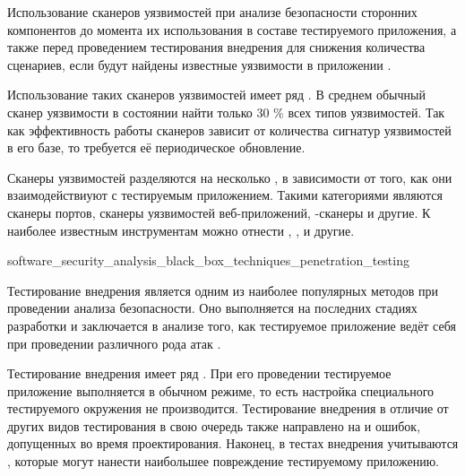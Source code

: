 %
Использование сканеров уязвимостей  при анализе безопасности сторонних компонентов до момента их использования в составе тестируемого приложения, а также перед проведением тестирования внедрения для снижения количества сценариев, если будут найдены известные уязвимости в приложении . 

%
Использование таких сканеров уязвимостей имеет ряд  . 
%
В среднем обычный сканер уязвимости в состоянии найти только 30 \% всех типов уязвимостей. 
%
Так как эффективность работы сканеров зависит от количества сигнатур уязвимостей в его базе, то требуется её периодическое обновление.

%
Сканеры уязвимостей разделяются на несколько , в зависимости от того, как они взаимодействиуют с тестируемым приложением. 
%
Такими категориями являются сканеры портов, сканеры уязвимостей веб-приложений, -сканеры и другие. 
%
К наиболее известным инструментам можно отнести  ,  ,   и другие.


	{software_security_analysis_black_box_techniques_penetration_testing}

%
Тестирование внедрения является одним из наиболее популярных методов при проведении анализа безопасности. 
%
Оно выполняется на последних стадиях разработки  и заключается в анализе того, как тестируемое приложение ведёт себя при проведении различного рода атак .

%
Тестирование внедрения имеет ряд  . 
%
При его проведении тестируемое приложение выполняется в обычном режиме, то есть настройка специального тестируемого окружения не производится. 
%
Тестирование внедрения в отличие от других видов тестирования в свою очередь также направлено на  и ошибок, допущенных во время проектирования. 
%
Наконец, в тестах внедрения учитываются , которые могут нанести наибольшее повреждение тестируемому приложению.

